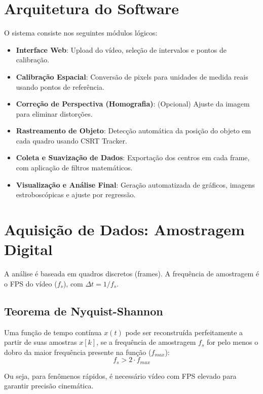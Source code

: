\section{Arquitetura do Software}
O sistema consiste nos seguintes módulos lógicos:
\begin{itemize}
    \item \textbf{Interface Web}: Upload do vídeo, seleção de intervalos e pontos de calibração.
    \item \textbf{Calibração Espacial}: Conversão de pixels para unidades de medida reais usando pontos de referência.
    \item \textbf{Correção de Perspectiva (Homografia)}: (Opcional) Ajuste da imagem para eliminar distorções.
    \item \textbf{Rastreamento de Objeto}: Detecção automática da posição do objeto em cada quadro usando CSRT Tracker.
    \item \textbf{Coleta e Suavização de Dados}: Exportação dos centros em cada frame, com aplicação de filtros matemáticos.
    \item \textbf{Visualização e Análise Final}: Geração automatizada de gráficos, imagens estroboscópicas e ajuste por regressão.
\end{itemize}

\section{Aquisição de Dados: Amostragem Digital}
A análise é baseada em quadros discretos (frames). A frequência de amostragem é o FPS do vídeo ($f_s$), com $\Delta t = 1/f_s$.
\subsection{Teorema de Nyquist-Shannon}
\begin{tcolorbox}[title=Teorema de Nyquist-Shannon]
Uma função de tempo contínua $x(t)$ pode ser reconstruída perfeitamente a partir de suas amostras $x[k]$, se a frequência de amostragem $f_s$ for pelo menos o dobro da maior frequência presente na função ($f_{max}$):
\begin{equation}
    f_s > 2 \cdot f_{max}
\end{equation}
\end{tcolorbox}
Ou seja, para fenômenos rápidos, é necessário vídeo com FPS elevado para garantir precisão cinemática.

